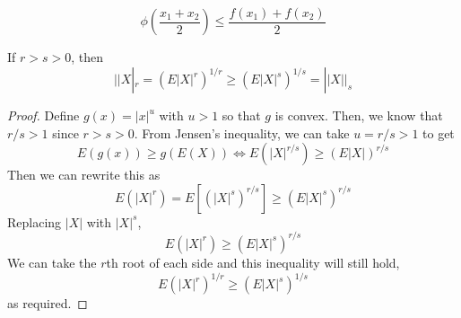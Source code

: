 \[\phi\left(\frac{x_1 + x_2}{2}\right) \leq \frac{f(x_1)+f(x_2)}{2}\] 
\begin{theorem}
    If $r > s > 0$, then 
    \[||X|_r = (E|X|^r)^{1/r} \geq (E|X|^s)^{1/s} = ||X||_s\]
\end{theorem}
\begin{proof}
    Define $g(x) = |x|^u$ with $u > 1$ so that $g$ is convex. Then, we know that $r/s > 1$ since $r > s > 0$. From Jensen's inequality, we can take $u = r/s > 1$ to get
    \[E(g(x)) \geq g(E(X)) \iff E(|X|^{r/s}) \geq (E|X|)^{r/s}\]
    Then we can rewrite this as
    \[E(|X|^r) = E\left[(|X|^s)^{r/s}\right] \geq (E|X|^s)^{r/s}\]
    Replacing $|X|$ with $|X|^s$, 
    \[E(|X|^r) \geq (E|X|^s)^{r/s}\]
    We can take the $r$th root of each side and this inequality will still hold, 
    \[E(|X|^r)^{1/r} \geq (E|X|^s)^{1/s}\]
    as required.
\end{proof}